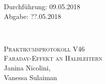



\begin{titlepage}
  \begin{flushleft}
 Durchführung: 09.05.2018\\
 Abgabe: ??.05.2018
  \end{flushleft}


\HRule\\[1,0cm]

 \begin{center}


\textsc{\LARGE Praktikumsprotokoll V46}\\[1.5cm]
\textsc{\huge Faraday-Effekt an Halbleitern} \\[5,5cm]

Janina Nicolini\footnotemark[1], \\
Vanessa Sulaiman\footnotemark[2] \\[1,0cm]



 \end{center}
\HRule

 \vfill

\end{titlepage}






\printbibliography


